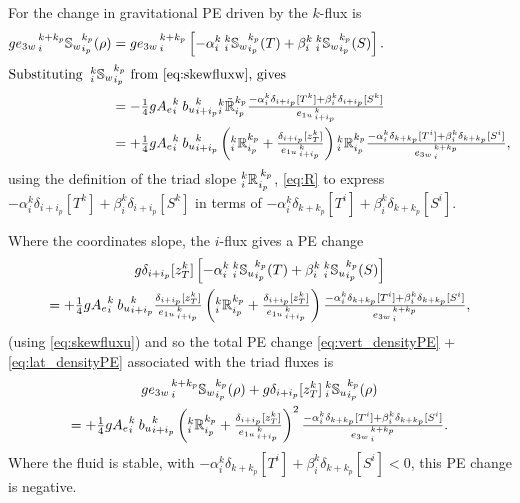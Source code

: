 \documentclass[../tex_main/NEMO_manual]{subfiles}
\begin{document}
For the change in gravitational PE driven by the $k$-flux is
\begin{align}
  \label{eq:vert_densityPE}
  g {e_{3w}}_{\,i}^{\,k+k_p}{\mathbb{S}_w}_{i_p}^{k_p} (\rho)
  &=g {e_{3w}}_{\,i}^{\,k+k_p}\left[-\alpha _i^k {\:}_i^k
    {\mathbb{S}_w}_{i_p}^{k_p} (T) + \beta_i^k {\:}_i^k
    {\mathbb{S}_w}_{i_p}^{k_p} (S) \right]. \notag \\
\intertext{Substituting  ${\:}_i^k {\mathbb{S}_w}_{i_p}^{k_p}$ from
  \autoref{eq:skewfluxw}, gives}
 &=-\quarter g{A_e}_i^k{\: }{b_u}_{i+i_p}^k {_i^k\tilde{\mathbb{R}}_{i_p}^{k_p}}
\frac{ -\alpha _i^k\delta_{i+ i_p}[T^k]+ \beta_i^k\delta_{i+ i_p}[S^k]} { {e_{1u}}_{\,i + i_p}^{\,k} } \notag \\
 &=+\quarter g{A_e}_i^k{\: }{b_u}_{i+i_p}^k
     \left({_i^k\mathbb{R}_{i_p}^{k_p}}+\frac{\delta_{i+i_p}[z_T^k]}{{e_{1u}}_{\,i + i_p}^{\,k}}\right) {_i^k\mathbb{R}_{i_p}^{k_p}}
\frac{-\alpha_i^k \delta_{k+ k_p}[T^i]+ \beta_i^k\delta_{k+ k_p}[S^i]} {{e_{3w}}_{\,i}^{\,k+k_p}},
\end{align}
using the definition of the triad slope ${}_{i}^{k}{\mathbb{R}_{}}_{i_p}^{\,k_p}$,
\autoref{eq:R} to express $-\alpha _i^k\delta_{i+ i_p}[T^k]+
\beta_i^k\delta_{i+ i_p}[S^k]$ in terms of  $-\alpha_i^k \delta_{k+
  k_p}[T^i]+ \beta_i^k\delta_{k+ k_p}[S^i]$.

Where the coordinates slope, the $i$-flux gives a PE change
\begin{multline}
  \label{eq:lat_densityPE}
 g \delta_{i+i_p}[z_T^k]
\left[
-\alpha _i^k {\:}_i^k {\mathbb{S}_u}_{i_p}^{k_p} (T) + \beta_i^k {\:}_i^k {\mathbb{S}_u}_{i_p}^{k_p} (S)
\right] \\
= +\textstyle\frac{1}{4} g{A_e}_i^k{\: }{b_u}_{i+i_p}^k
     \frac{\delta_{i+i_p}[z_T^k]}{{e_{1u}}_{\,i + i_p}^{\,k}}
\left({_i^k\mathbb{R}_{i_p}^{k_p}}+\frac{\delta_{i+i_p}[z_T^k]}{{e_{1u}}_{\,i + i_p}^{\,k}}\right)
\frac{-\alpha_i^k \delta_{k+ k_p}[T^i]+ \beta_i^k\delta_{k+ k_p}[S^i]} {{e_{3w}}_{\,i}^{\,k+k_p}},
\end{multline}
(using \autoref{eq:skewfluxu}) and so the total PE change
\autoref{eq:vert_densityPE} + \autoref{eq:lat_densityPE} associated with the triad fluxes is
\begin{multline}
  \label{eq:tot_densityPE}
  g{e_{3w}}_{\,i}^{\,k+k_p}{\mathbb{S}_w}_{i_p}^{k_p} (\rho) +
g\delta_{i+i_p}[z_T^k] {\:}_i^k {\mathbb{S}_u}_{i_p}^{k_p} (\rho) \\
= +\textstyle\frac{1}{4} g{A_e}_i^k{\: }{b_u}_{i+i_p}^k
     \left({_i^k\mathbb{R}_{i_p}^{k_p}}+\frac{\delta_{i+i_p}[z_T^k]}{{e_{1u}}_{\,i + i_p}^{\,k}}\right)^2
\frac{-\alpha_i^k \delta_{k+ k_p}[T^i]+ \beta_i^k\delta_{k+ k_p}[S^i]} {{e_{3w}}_{\,i}^{\,k+k_p}}.
\end{multline}
Where the fluid is stable, with $-\alpha_i^k \delta_{k+ k_p}[T^i]+
\beta_i^k\delta_{k+ k_p}[S^i]<0$, this PE change is negative.
\end{document}
